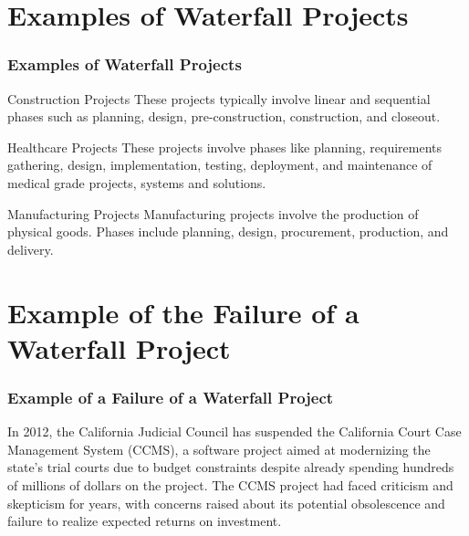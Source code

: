 \documentclass[10pt]{beamer}
\begin{document}
\section{Examples of Waterfall Projects}
\begin{frame}
\frametitle{Examples of Waterfall Projects}
\begin{block}{Construction Projects}
These projects typically involve linear and sequential phases such as planning, design, pre-construction, construction, and closeout.
\end{block}

\begin{block}{Healthcare Projects}
These projects involve phases like planning, requirements gathering, design, implementation, testing, deployment, and maintenance of medical grade projects, systems and solutions.
\end{block}

\begin{block}{Manufacturing Projects}
Manufacturing projects involve the production of physical goods. Phases include planning, design, procurement, production, and delivery.
\end{block}
\end{frame}

\section{Example of the Failure of a Waterfall Project}
\begin{frame}
\frametitle{Example of a Failure of a Waterfall Project}
In 2012, the California Judicial Council has suspended the California Court Case Management System (CCMS), a software project aimed at modernizing the state's trial courts due to budget constraints despite already spending hundreds of millions of dollars on the project. The CCMS project had faced criticism and skepticism for years, with concerns raised about its potential obsolescence and failure to realize expected returns on investment.
\end{frame}
\end{document}
